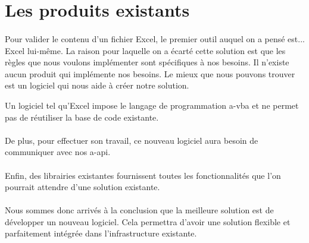 \section{Les produits existants}
\label{sec:existing-products}

\paragraph{}
Pour valider le contenu d'un fichier Excel, le premier outil auquel on a pensé est... Excel lui-même.
La raison pour laquelle on a écarté cette solution est que les règles que nous voulons implémenter sont spécifiques à nos besoins.
Il n'existe aucun produit qui implémente nos besoins.
Le mieux que nous pouvons trouver est un logiciel qui nous aide à créer notre solution.

Un logiciel tel qu’Excel impose le langage de programmation \gls{a-vba} et ne permet pas de réutiliser la base de code existante.

\paragraph{}
De plus, pour effectuer son travail, ce nouveau logiciel aura besoin de communiquer avec nos \gls{a-api}.

\paragraph{}
Enfin, des librairies existantes fournissent toutes les fonctionnalités que l'on pourrait attendre d'une solution existante.

\paragraph{}
Nous sommes donc arrivés à la conclusion que la meilleure solution est de développer un nouveau logiciel.
Cela permettra d'avoir une solution flexible et parfaitement intégrée dans l'infrastructure existante.
